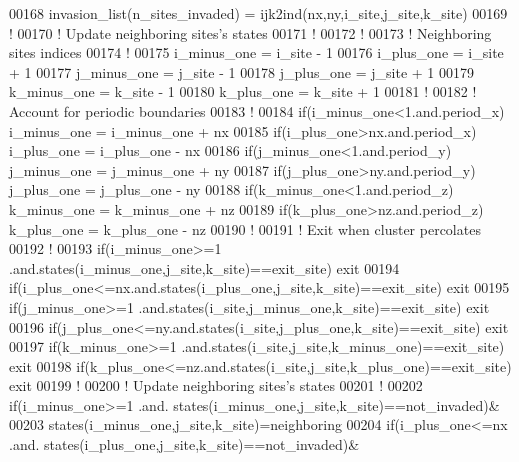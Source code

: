 \begin{DoxyCode}
00168        invasion\_list(n\_sites\_invaded) = ijk2ind(nx,ny,i\_site,j\_site,k\_site)
00169        \textcolor{comment}{!}
00170        \textcolor{comment}{! Update neighboring sites's states}
00171        \textcolor{comment}{!}
00172        \textcolor{comment}{!}
00173        \textcolor{comment}{! Neighboring sites indices }
00174        \textcolor{comment}{!}
00175        i\_minus\_one = i\_site - 1
00176        i\_plus\_one  = i\_site + 1
00177        j\_minus\_one = j\_site - 1
00178        j\_plus\_one  = j\_site + 1
00179        k\_minus\_one = k\_site - 1
00180        k\_plus\_one  = k\_site + 1
00181        \textcolor{comment}{!}
00182        \textcolor{comment}{! Account for periodic boundaries}
00183        \textcolor{comment}{!}
00184        \textcolor{keyword}{if}(i\_minus\_one<1.and.period\_x) i\_minus\_one = i\_minus\_one + nx
00185        \textcolor{keyword}{if}(i\_plus\_one>nx.and.period\_x) i\_plus\_one  = i\_plus\_one  - nx
00186        \textcolor{keyword}{if}(j\_minus\_one<1.and.period\_y) j\_minus\_one = j\_minus\_one + ny
00187        \textcolor{keyword}{if}(j\_plus\_one>ny.and.period\_y) j\_plus\_one  = j\_plus\_one  - ny
00188        \textcolor{keyword}{if}(k\_minus\_one<1.and.period\_z) k\_minus\_one = k\_minus\_one + nz
00189        \textcolor{keyword}{if}(k\_plus\_one>nz.and.period\_z) k\_plus\_one  = k\_plus\_one  - nz
00190        \textcolor{comment}{!}
00191        \textcolor{comment}{! Exit when cluster percolates}
00192        \textcolor{comment}{!}
00193        \textcolor{keyword}{if}(i\_minus\_one>=1 .and.states(i\_minus\_one,j\_site,k\_site)==exit\_site) 
      exit
00194        \textcolor{keyword}{if}(i\_plus\_one<=nx.and.states(i\_plus\_one,j\_site,k\_site)==exit\_site) exit
00195        \textcolor{keyword}{if}(j\_minus\_one>=1 .and.states(i\_site,j\_minus\_one,k\_site)==exit\_site) 
      exit
00196        \textcolor{keyword}{if}(j\_plus\_one<=ny.and.states(i\_site,j\_plus\_one,k\_site)==exit\_site) exit
00197        \textcolor{keyword}{if}(k\_minus\_one>=1 .and.states(i\_site,j\_site,k\_minus\_one)==exit\_site) 
      exit
00198        \textcolor{keyword}{if}(k\_plus\_one<=nz.and.states(i\_site,j\_site,k\_plus\_one)==exit\_site) exit
00199        \textcolor{comment}{!}
00200        \textcolor{comment}{! Update neighboring sites's states}
00201        \textcolor{comment}{!}
00202        \textcolor{keyword}{if}(i\_minus\_one>=1 .and. states(i\_minus\_one,j\_site,k\_site)==not\_invaded)&
00203             states(i\_minus\_one,j\_site,k\_site)=neighboring
00204        \textcolor{keyword}{if}(i\_plus\_one<=nx .and. states(i\_plus\_one,j\_site,k\_site)==not\_invaded)&

\end{DoxyCode}
